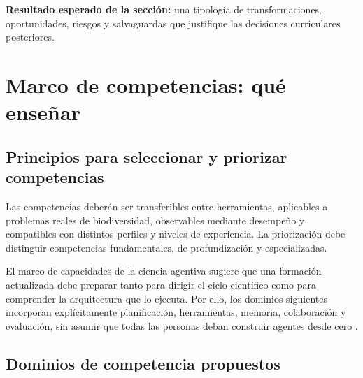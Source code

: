 \documentclass[11pt,a4paper]{article}
\begin{document}
\noindent\textbf{Resultado esperado de la sección:}
una tipología de transformaciones, oportunidades, riesgos y salvaguardas que
justifique las decisiones curriculares posteriores.

\section{Marco de competencias: qué enseñar}

\subsection{Principios para seleccionar y priorizar competencias}

Las competencias deberán ser transferibles entre herramientas, aplicables a
problemas reales de biodiversidad, observables mediante desempeño y compatibles
con distintos perfiles y niveles de experiencia. La priorización debe distinguir
competencias fundamentales, de profundización y especializadas.

El marco de capacidades de la ciencia agentiva sugiere que una formación
actualizada debe preparar tanto para dirigir el ciclo científico como para
comprender la arquitectura que lo ejecuta. Por ello, los dominios siguientes
incorporan explícitamente planificación, herramientas, memoria, colaboración y
evaluación, sin asumir que todas las personas deban construir agentes desde cero
\citep{wei2025agentic}.

\subsection{Dominios de competencia propuestos}
\end{document}

